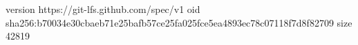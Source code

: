 version https://git-lfs.github.com/spec/v1
oid sha256:b70034e30cbaeb71e25bafb57ce25fa025fce5ea4893ec78c07118f7d8f82709
size 42819
